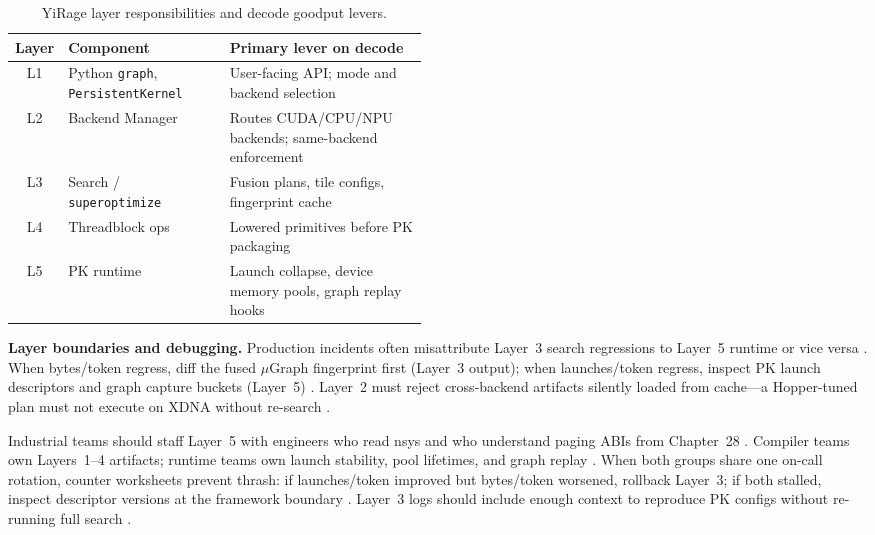 \begin{table}[t]
\centering
\caption{YiRage layer responsibilities and decode goodput levers.}
\label{tab:ch29_layers}
\begin{tabular}{@{}clp{0.48\linewidth}@{}}
\toprule
\textbf{Layer} & \textbf{Component} & \textbf{Primary lever on decode} \\
\midrule
L1 & Python \texttt{graph}, \texttt{PersistentKernel} & User-facing API; mode and backend selection \citep{yirage2026,chen2020compilerbasedhardw} \\
L2 & Backend Manager & Routes CUDA/CPU/NPU backends; same-backend enforcement \citep{yirage2026,amd2024xdna,amd2024aie} \\
L3 & Search / \texttt{superoptimize} & Fusion plans, tile configs, fingerprint cache \citep{yirage2026,taxbreak2026,memoryfloor2026} \\
L4 & Threadblock ops & Lowered primitives before PK packaging \citep{yirage2026,chen2020compilerbasedhardw,semianalysis2024tma} \\
L5 & PK runtime & Launch collapse, device memory pools, graph replay hooks \citep{yirage2026,nvidia2024cudagraphs,memoryfloor2026,patel2025llminference} \\
\bottomrule
\end{tabular}
\end{table}

\textbf{Layer boundaries and debugging.} Production incidents often misattribute Layer~3 search regressions to Layer~5 runtime or vice versa \citep{yirage2026,chen2020compilerbasedhardw,patel2025llminference,taxbreak2026,memoryfloor2026,kwon2023vllm,dlbook}. When bytes/token regress, diff the fused $\mu$Graph fingerprint first (Layer~3 output); when launches/token regress, inspect PK launch descriptors and graph capture buckets (Layer~5) \citep{yirage2026,nvidia2024cudagraphs,taxbreak2026,memoryfloor2026,patel2025llminference,chen2020compilerbasedhardw,kwon2023vllm,dao2022flashattention,dlbook}. Layer~2 must reject cross-backend artifacts silently loaded from cache---a Hopper-tuned plan must not execute on XDNA without re-search \citep{yirage2026,chen2020compilerbasedhardw,amd2024xdna,amd2024aie,patel2025llminference,dlbook}.

Industrial teams should staff Layer~5 with engineers who read nsys and who understand paging ABIs from Chapter~28 \citep{kwon2023vllm,patel2025llminference,yirage2026,chen2020compilerbasedhardw,dlbook}. Compiler teams own Layers~1--4 artifacts; runtime teams own launch stability, pool lifetimes, and graph replay \citep{yirage2026,chen2020compilerbasedhardw,patel2025llminference,dlbook}. When both groups share one on-call rotation, counter worksheets prevent thrash: if launches/token improved but bytes/token worsened, rollback Layer~3; if both stalled, inspect descriptor versions at the framework boundary \citep{taxbreak2026,memoryfloor2026,patel2025llminference,yirage2026,chen2020compilerbasedhardw,kwon2023vllm,dlbook}. Layer~3 logs should include enough context to reproduce PK configs without re-running full search \citep{yirage2026,chen2020compilerbasedhardw,patel2025llminference,dlbook}.

